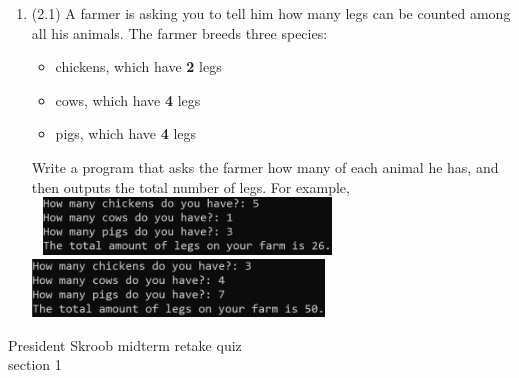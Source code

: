 \documentclass{article}
\begin{document}
\begin{enumerate}
\item (2.1)
		A farmer is asking you to tell him how many legs can be counted among all his animals. 
		The farmer breeds three species:
		\begin{itemize}
			\item chickens, which have \textbf{2} legs
			\item cows, which have \textbf{4} legs
			\item pigs, which have \textbf{4} legs
		\end{itemize}
		Write a program that asks the farmer how many of each animal he has, and then outputs the
		total number of legs.  		
		For example, \\ \ \hfill
		\includegraphics[height = 0.6in]{./imgs/animalLegs_ex1.PNG} \hfill
		\includegraphics[height = 0.6in]{./imgs/animalLegs_ex2.PNG} \hfill \



\end{enumerate}
\pagebreak
President Skroob \hfill midterm retake quiz\\
section 1\\
\end{document}
